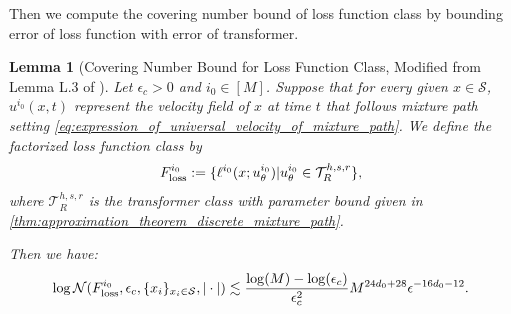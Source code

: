 \documentclass[12pt]{article}
\numberwithin{equation}{section}
\let\cite\citep
\theoremstyle{theoremstyle}
\newtheorem{lemma}{Lemma}[section]
\numberwithin{equation}{section}
\numberwithin{theorem}{section}
\numberwithin{proposition}{section}
\numberwithin{definition}{section}
\numberwithin{lemma}{section}
\numberwithin{assumption}{section}
\numberwithin{remark}{section}
\begin{document}
Then we compute the covering number bound of loss function class by bounding error of loss function with error of transformer.

\begin{lemma}[Covering Number Bound for Loss Function Class, Modified from Lemma L.3 of \cite{su2025high}]\label{lem:covering_number_bounds_for_loss_function_class_mixture_path}
Let $\epsilon_c>0$ and $i_0\in[M]$.
Suppose that for every given $x\in \mathcal{S}$, $u^{i_0}(x,t)$ represent the velocity field of $x$ at time $t$ that follows mixture path setting \eqref{eq:expression_of_universal_velocity_of_mixture_path}.
We define the factorized loss function class by 
\begin{align*}
F^{i_0}_{\rm loss}:=\{\ell^{i_0}(x;u^{i_0}_\theta)|u^{i_0}_\theta\in\mathcal{T}^{h,s,r}_R\},
\end{align*}
where $\mathcal{T}^{h,s,r}_R$ is the transformer class with parameter bound given in \cref{thm:approximation_theorem_discrete_mixture_path}.

Then we have:
\begin{align*}
    \log\mathcal{N}(F^{i_0}_{\rm loss},\epsilon_c,\{x_i\}_{x_i\in \mathcal{S}},|\cdot|)\lesssim \frac{\log(M)-\log(\epsilon_c)}{\epsilon_c^2}M^{24d_0+28}\epsilon^{-16d_0-12}.
\end{align*}
\end{lemma}
\end{document}
